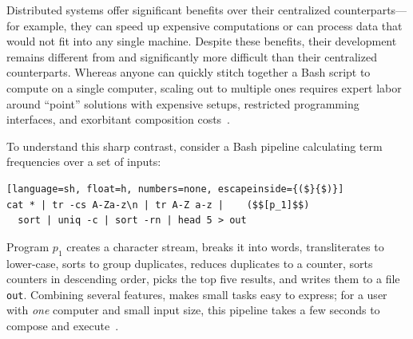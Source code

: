 \documentclass[sigplan,10pt,review,anonymous]{acmart}
\newcommand{\ttt}[1]{\texttt{\small #1}}
\begin{document}
Distributed systems offer significant benefits over their centralized counterparts---for example, they can speed up expensive computations or can process data that would not fit into any single machine.
Despite these benefits, their development remains different from and significantly more difficult than their centralized counterparts.
Whereas anyone can quickly stitch together a Bash script to compute on a single computer, 
   scaling out to multiple ones requires expert labor around ``point'' solutions with expensive setups, restricted programming interfaces, and exorbitant composition costs~\cite{taurus:14, dios:13, andromeda:15, pywren:17, futuredata:18, nefele:18}.

To understand this sharp contrast, consider a Bash pipeline calculating term frequencies over a set of inputs:


\begin{lstlisting}[language=sh, float=h, numbers=none, escapeinside={($}{$)}]
cat * | tr -cs A-Za-z\n | tr A-Z a-z |    ($$[p_1]$$)
  sort | uniq -c | sort -rn | head 5 > out
\end{lstlisting}

\noindent
Program $p_1$ creates a character stream, breaks it into words, transliterates to lower-case, sorts to group duplicates, reduces duplicates to a counter, sorts counters in descending order, picks the top five results, and writes them to a file \ttt{out}.
Combining several features, \unix makes small tasks easy to express;
  for a user with \emph{one} computer and small input size, this pipeline takes a few seconds to compose and execute~\cite{bentley1986literate}.
\end{document}

